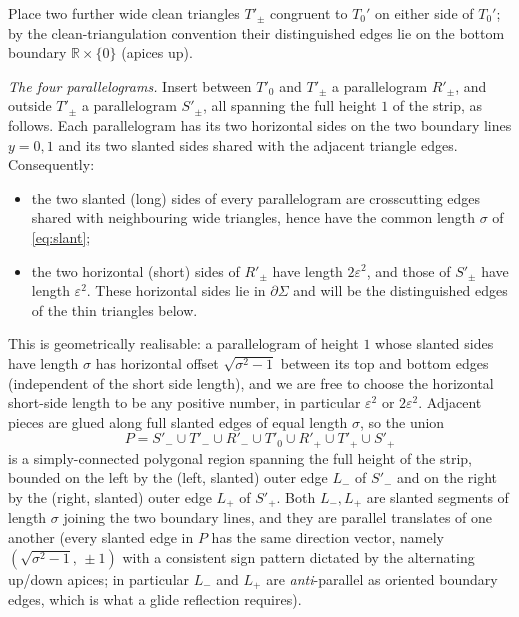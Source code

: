 \documentclass[12pt]{article}
\newcommand{\R}{\mathbb{R}}
\newcommand{\eps}{\varepsilon}
\newcommand{\Sig}{\Sigma}
\begin{document}
Place two further wide clean triangles $T'_\pm$ congruent to $T_0'$ on
either side of $T_0'$; by the clean-triangulation convention their
distinguished edges lie on the bottom boundary $\R\times\{0\}$ (apices up).

\smallskip
\emph{The four parallelograms.}
Insert between $T'_0$ and $T'_\pm$ a parallelogram $R'_\pm$, and outside
$T'_\pm$ a parallelogram $S'_\pm$, all spanning the full height $1$ of the
strip, as follows. Each parallelogram has its two horizontal sides on the
two boundary lines $y=0,1$ and its two slanted sides shared with the
adjacent triangle edges. Consequently:
\begin{itemize}
\item the two slanted (long) sides of every parallelogram are crosscutting
edges shared with neighbouring wide triangles, hence have the common
length $\sigma$ of \eqref{eq:slant};
\item the two horizontal (short) sides of $R'_\pm$ have length $2\eps^2$,
and those of $S'_\pm$ have length $\eps^2$. These horizontal sides lie in
$\partial\Sig$ and will be the distinguished edges of the thin triangles
below.
\end{itemize}
This is geometrically realisable: a parallelogram of height $1$ whose
slanted sides have length $\sigma$ has horizontal offset
$\sqrt{\sigma^2-1}$ between its top and bottom edges (independent of the
short side length), and we are free to choose the horizontal short-side
length to be any positive number, in particular $\eps^2$ or $2\eps^2$.
Adjacent pieces are glued along full slanted edges of equal length
$\sigma$, so the union
\[
P=S'_-\cup T'_-\cup R'_-\cup T'_0\cup R'_+\cup T'_+\cup S'_+
\]
is a simply-connected polygonal region spanning the full height of the
strip, bounded on the left by the (left, slanted) outer edge $L_-$ of
$S'_-$ and on the right by the (right, slanted) outer edge $L_+$ of
$S'_+$. Both $L_-,L_+$ are slanted segments of length $\sigma$ joining the
two boundary lines, and they are parallel translates of one another (every
slanted edge in $P$ has the same direction vector, namely
$(\sqrt{\sigma^2-1},\,\pm1)$ with a consistent sign pattern dictated by
the alternating up/down apices; in particular $L_-$ and $L_+$ are
\emph{anti}-parallel as oriented boundary edges, which is what a glide
reflection requires).
\end{document}
